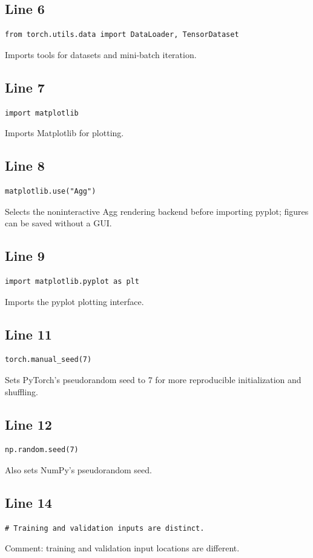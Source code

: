 \documentclass[11pt,a4paper]{article}
\begin{document}
\subsection*{Line 6}
\begin{lstlisting}
from torch.utils.data import DataLoader, TensorDataset
\end{lstlisting}
Imports tools for datasets and mini-batch iteration.

\subsection*{Line 7}
\begin{lstlisting}
import matplotlib
\end{lstlisting}
Imports Matplotlib for plotting.

\subsection*{Line 8}
\begin{lstlisting}
matplotlib.use("Agg")
\end{lstlisting}
Selects the noninteractive Agg rendering backend before importing pyplot; figures can be saved without a GUI.

\subsection*{Line 9}
\begin{lstlisting}
import matplotlib.pyplot as plt
\end{lstlisting}
Imports the pyplot plotting interface.

\subsection*{Line 11}
\begin{lstlisting}
torch.manual_seed(7)
\end{lstlisting}
Sets PyTorch's pseudorandom seed to 7 for more reproducible initialization and shuffling.

\subsection*{Line 12}
\begin{lstlisting}
np.random.seed(7)
\end{lstlisting}
Also sets NumPy's pseudorandom seed.

\subsection*{Line 14}
\begin{lstlisting}
# Training and validation inputs are distinct.
\end{lstlisting}
Comment: training and validation input locations are different.
\end{document}
